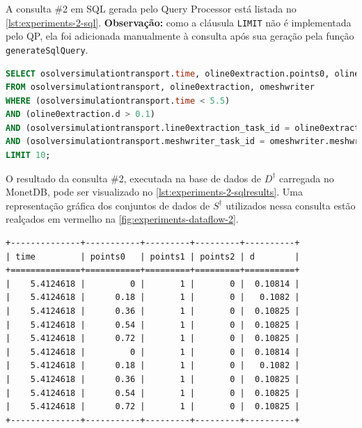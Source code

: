 A consulta \#2 em SQL gerada pelo Query Processor está listada no \autoref{lst:experiments-2-sql}. \textbf{Observação:} como a cláusula \texttt{LIMIT} não é implementada pelo QP, ela foi adicionada manualmente à consulta após sua geração pela função \texttt{generateSqlQuery}.

\begin{minipage}[c]{0.95\textwidth}
\begin{lstlisting}[language=sql,label={lst:experiments-2-sql},caption={[Código em SQL gerado na consulta~\#2]Código em SQL gerado na consulta~\#2 (tempo médio: 15,45~ms).}]
SELECT osolversimulationtransport.time, oline0extraction.points0, oline0extraction.points1, oline0extraction.points2, oline0extraction.d
FROM osolversimulationtransport, oline0extraction, omeshwriter
WHERE (osolversimulationtransport.time < 5.5) 
AND (oline0extraction.d > 0.1) 
AND (osolversimulationtransport.line0extraction_task_id = oline0extraction.line0extraction_task_id) 
AND (osolversimulationtransport.meshwriter_task_id = omeshwriter.meshwriter_task_id)
LIMIT 10;
\end{lstlisting}
\end{minipage}

O resultado da consulta \#2, executada na base de dados de \(D^{\dagger}\) carregada no MonetDB, pode ser visualizado no \autoref{lst:experiments-2-sqlresults}. Uma representação gráfica dos conjuntos de dados de \(S^{\dagger}\) utilizados nessa consulta estão realçados em vermelho na \autoref{fig:experiments-dataflow-2}.

\begin{lstlisting}[language=sqlresults,label={lst:experiments-2-sqlresults},caption={[Resultados da consulta \#2.]Resultados da consulta \#2 (10 tuplas, tempo médio: 5,92~ms).}]
+--------------+-----------+---------+---------+----------+
| time         | points0   | points1 | points2 | d        |
+==============+===========+=========+=========+==========+
|    5.4124618 |         0 |       1 |       0 |  0.10814 |
|    5.4124618 |      0.18 |       1 |       0 |   0.1082 |
|    5.4124618 |      0.36 |       1 |       0 |  0.10825 |
|    5.4124618 |      0.54 |       1 |       0 |  0.10825 |
|    5.4124618 |      0.72 |       1 |       0 |  0.10825 |
|    5.4124618 |         0 |       1 |       0 |  0.10814 |
|    5.4124618 |      0.18 |       1 |       0 |   0.1082 |
|    5.4124618 |      0.36 |       1 |       0 |  0.10825 |
|    5.4124618 |      0.54 |       1 |       0 |  0.10825 |
|    5.4124618 |      0.72 |       1 |       0 |  0.10825 |
+--------------+-----------+---------+---------+----------+
\end{lstlisting}

